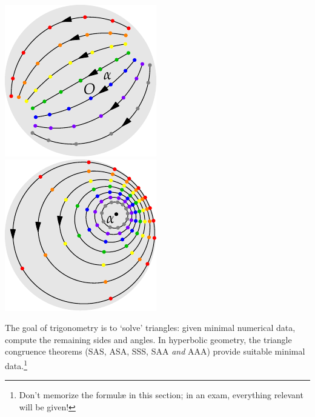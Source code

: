 \begin{minipage}[t]{0.24\linewidth}\vspace{-3pt}
	\flushright\includegraphics[scale=0.95]{isom-trans}\\
	\includegraphics[scale=0.95]{isom-rotate}
\end{minipage}

\goodbreak




The goal of trigonometry is to `solve' triangles: given minimal numerical data, compute the remaining sides and angles. In hyperbolic geometry, the triangle congruence theorems (SAS, ASA, SSS, SAA \emph{and} AAA) provide suitable minimal data.\footnote{%
		Don't memorize the formulæ in this section; in an exam, everything relevant will be given!
	}
\smallbreak

